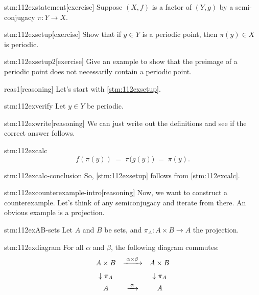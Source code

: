 
\begin{stm}{stm:112exstatement}[exercise]
Suppose $(X,f)$ is a factor of $(Y,g)$ by a semi-conjugacy $\pi\colon Y \to X$.
\end{stm}

\begin{stm}{stm:112exsetup}[exercise]
Show that if $y \in Y$ is a periodic point, then $\pi(y) \in X$ is periodic.
\end{stm}

\begin{stm}{stm:112exsetup2}[exercise]
Give an example to show that the preimage of a periodic point does not necessarily contain a periodic point.
\end{stm}


\begin{stm}{reas1}[reasoning]
Let's start with \ref{stm:112exsetup}.
\end{stm}

\begin{stm}{stm:112exverify}
Let $y \in Y$ be periodic.
\end{stm}

\begin{stm}{stm:112exwrite}[reasoning]
We can just write out the definitions and see if the correct answer follows.
\end{stm}

\begin{stm}{stm:112excalc}
$$
f(\pi(y)) \;=\; \pi\bigl(g(y)\bigr) \;=\; \pi(y).
$$
\end{stm}

\begin{stm}{stm:112excalc-conclusion}
So, \ref{stm:112exsetup} follows from \ref{stm:112excalc}.
\end{stm}

\begin{stm}{stm:112excounterexample-intro}[reasoning]
Now, we want to construct a counterexample. Let's think of any semiconjugacy and iterate from there. An obvious example is a projection.
\end{stm}

\begin{stm}{stm:112exAB-sets}
Let $A$ and $B$ be sets, and $\pi_A\colon A \times B \to A$ the projection.
\end{stm}

\begin{stm}{stm:112exdiagram}
For all $\alpha$ and $\beta$, the following diagram commutes:
\[
\begin{array}{c@{\quad}c@{\quad}c}
A \times B & \xrightarrow{\;\alpha \times \beta\;} & A \times B\\[6pt]
\downarrow{\pi_A} && \downarrow{\pi_A}\\[4pt]
A & \xrightarrow{\;\alpha\;} & A
\end{array}
\]
\end{stm}

